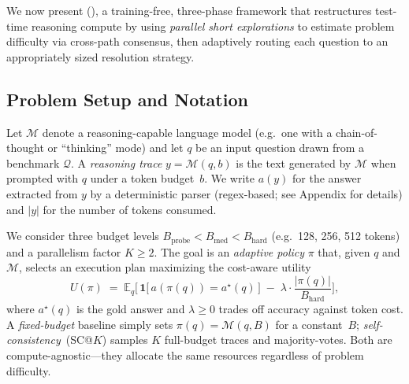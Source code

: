 
We now present \method{} (\fullmethod{}), a training-free, three-phase
framework that restructures test-time reasoning compute by using
\emph{parallel short explorations} to estimate problem difficulty via
cross-path consensus, then adaptively routing each question to an
appropriately sized resolution strategy.

\subsection{Problem Setup and Notation}
\label{sec:method:setup}

Let $\mathcal{M}$ denote a reasoning-capable language model (e.g.\ one with
a chain-of-thought or ``thinking'' mode) and let $q$ be an input question
drawn from a benchmark $\mathcal{Q}$.
A \emph{reasoning trace} $y = \mathcal{M}(q, b)$ is the text generated by
$\mathcal{M}$ when prompted with $q$ under a token budget~$b$.
We write $a(y)$ for the answer extracted from $y$ by a deterministic parser
(regex-based; see Appendix for details) and $|y|$ for the number of tokens
consumed.

We consider three budget levels
$B_{\mathrm{probe}} < B_{\mathrm{med}} < B_{\mathrm{hard}}$
(e.g.\ 128, 256, 512 tokens) and a parallelism factor $K \geq 2$.
The goal is an \emph{adaptive policy} $\pi$ that, given $q$ and
$\mathcal{M}$, selects an execution plan maximizing the cost-aware utility
\begin{equation}
  \label{eq:rs-utility}
  U(\pi) \;=\; \mathbb{E}_{q}\!\Big[\,
    \mathbf{1}\big[\,a(\pi(q)) = a^{\star}(q)\,\big]
    \;-\; \lambda \cdot \frac{|\pi(q)|}{B_{\mathrm{hard}}}
  \Big],
\end{equation}
where $a^{\star}(q)$ is the gold answer and $\lambda \geq 0$ trades off
accuracy against token cost.
A \emph{fixed-budget} baseline simply sets $\pi(q) = \mathcal{M}(q, B)$
for a constant~$B$; \emph{self-consistency}~(SC@$K$) samples $K$ full-budget
traces and majority-votes.
Both are compute-agnostic---they allocate the same resources regardless of
problem difficulty.

